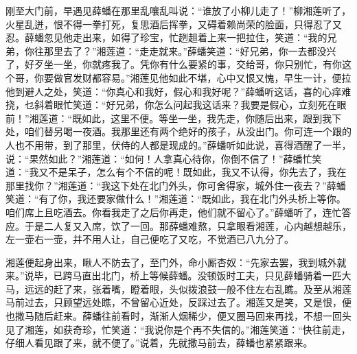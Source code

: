 刚至大门前，早遇见薛蟠在那里乱嚷乱叫说：“谁放了小柳儿走了！”柳湘莲听了，火星乱迸，恨不得一拳打死，复思酒后挥拳，又碍着赖尚荣的脸面，只得忍了又忍。薛蟠忽见他走出来，如得了珍宝，忙趔趄着上来一把拉住，笑道：“我的兄弟，你往那里去了？”湘莲道：“走走就来。”薛蟠笑道：“好兄弟，你一去都没兴了，好歹坐一坐，你就疼我了。凭你有什么要紧的事，交给哥，你只别忙，有你这个哥，你要做官发财都容易。”湘莲见他如此不堪，心中又恨又愧，早生一计，便拉他到避人之处，笑道：“你真心和我好，假心和我好呢？”薛蟠听这话，喜的心痒难挠，乜斜着眼忙笑道：“好兄弟，你怎么问起我这话来？我要是假心，立刻死在眼前！”湘莲道：“既如此，这里不便。等坐一坐，我先走，你随后出来，跟到我下处，咱们替另喝一夜酒。我那里还有两个绝好的孩子，从没出门。你可连一个跟的人也不用带，到了那里，伏侍的人都是现成的。”薛蟠听如此说，喜得酒醒了一半，说：“果然如此？”湘莲道：“如何！人拿真心待你，你倒不信了！”薛蟠忙笑道：“我又不是呆子，怎么有个不信的呢！既如此，我又不认得，你先去了，我在那里找你？”湘莲道：“我这下处在北门外头，你可舍得家，城外住一夜去？”薛蟠笑道：“有了你，我还要家做什么！”湘莲道：“既如此，我在北门外头桥上等你。咱们席上且吃酒去。你看我走了之后你再走，他们就不留心了。”薛蟠听了，连忙答应。于是二人复又入席，饮了一回。那薛蟠难熬，只拿眼看湘莲，心内越想越乐，左一壶右一壶，并不用人让，自己便吃了又吃，不觉酒已八九分了。

湘莲便起身出来，瞅人不防去了，至门外，命小厮杏奴：“先家去罢，我到城外就来。”说毕，已跨马直出北门，桥上等候薛蟠。没顿饭时工夫，只见薛蟠骑着一匹大马，远远的赶了来，张着嘴，瞪着眼，头似拨浪鼓一般不住左右乱瞧。及至从湘莲马前过去，只顾望远处瞧，不曾留心近处，反踩过去了。湘莲又是笑，又是恨，便也撒马随后赶来。薛蟠往前看时，渐渐人烟稀少，便又圈马回来再找，不想一回头见了湘莲，如获奇珍，忙笑道：“我说你是个再不失信的。”湘莲笑道：“快往前走，仔细人看见跟了来，就不便了。”说着，先就撒马前去，薛蟠也紧紧跟来。

